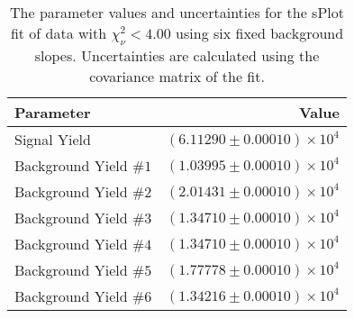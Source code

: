
\begin{table}[ht]
    \begin{center}
        \begin{tabular}{lr}\toprule
            Parameter & Value \\\midrule
            Signal Yield & $(6.11290 \pm 0.00010) \times 10^{4}$ \\
            Background Yield $\#1$ & $(1.03995 \pm 0.00010) \times 10^{4}$ \\
            Background Yield $\#2$ & $(2.01431 \pm 0.00010) \times 10^{4}$ \\
            Background Yield $\#3$ & $(1.34710 \pm 0.00010) \times 10^{4}$ \\
            Background Yield $\#4$ & $(1.34710 \pm 0.00010) \times 10^{4}$ \\
            Background Yield $\#5$ & $(1.77778 \pm 0.00010) \times 10^{4}$ \\
            Background Yield $\#6$ & $(1.34216 \pm 0.00010) \times 10^{4}$ \\\bottomrule
        \end{tabular}
        \caption{The parameter values and uncertainties for the sPlot fit of data with $\chi^2_\nu < 4.00$ using six fixed background slopes. Uncertainties are calculated using the covariance matrix of the fit.}\label{tab:splot-fit-results-chisqdof-4.00-fixed-6}
    \end{center}
\end{table}
